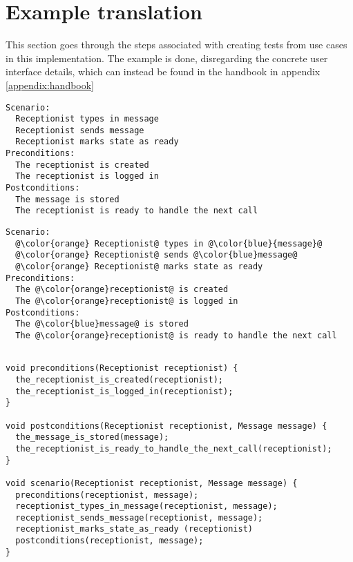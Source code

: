 \section{Example translation}
This section goes through the steps associated with creating tests from use cases in this implementation. The example is done, disregarding the concrete user interface details, which can instead be found in the handbook in appendix \ref{appendix:handbook}

\begin{lstlisting}[frame=single,style=usecase, caption=Use case example revisited, label=lst:uc-simple-example-revisited]
Scenario:
  Receptionist types in message
  Receptionist sends message
  Receptionist marks state as ready 
Preconditions:
  The receptionist is created
  The receptionist is logged in
Postconditions:
  The message is stored
  The receptionist is ready to handle the next call
\end{lstlisting}

\begin{lstlisting}[frame=single,style=usecase, caption=Use case example with its different parts highlighted, label=lst:uc-simple-example-highlighted-revisited]
Scenario:
  @\color{orange} Receptionist@ types in @\color{blue}{message}@
  @\color{orange} Receptionist@ sends @\color{blue}message@
  @\color{orange} Receptionist@ marks state as ready
Preconditions:
  The @\color{orange}receptionist@ is created
  The @\color{orange}receptionist@ is logged in
Postconditions:
  The @\color{blue}message@ is stored
  The @\color{orange}receptionist@ is ready to handle the next call
\end{lstlisting} 

\begin{lstlisting}[style=Dart, caption=Example of generated code without a template applied concept,label={lst:generated-test-code-example}]

void preconditions(Receptionist receptionist) {
  the_receptionist_is_created(receptionist);
  the_receptionist_is_logged_in(receptionist);
}

void postconditions(Receptionist receptionist, Message message) {
  the_message_is_stored(message);
  the_receptionist_is_ready_to_handle_the_next_call(receptionist);
}

void scenario(Receptionist receptionist, Message message) {
  preconditions(receptionist, message);
  receptionist_types_in_message(receptionist, message);
  receptionist_sends_message(receptionist, message);
  receptionist_marks_state_as_ready (receptionist)  
  postconditions(receptionist, message);
}

\end{lstlisting}



